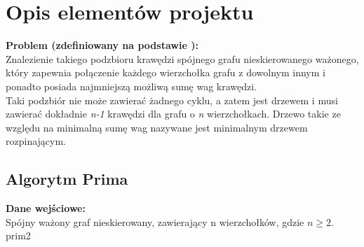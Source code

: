 \chapter [Sprawozdanie 2]{Opis elementów projektu} 
\fancyhead[L]{}
\fancyhead[R]{}
\textbf{Problem (zdefiniowany na podstawie \cite{prim2}):}\\
Znalezienie takiego podzbioru krawędzi spójnego grafu nieskierowanego ważonego, który zapewnia połączenie każdego wierzchołka grafu z dowolnym innym i ponadto posiada najmniejszą możliwą sumę wag krawędzi. \\Taki podzbiór nie może zawierać żadnego cyklu, a zatem jest drzewem i musi zawierać dokładnie \emph{n-1} krawędzi dla grafu o \emph{n} wierzchołkach. Drzewo takie ze względu na minimalną sumę wag nazywane jest minimalnym drzewem rozpinającym.

\section{Algorytm Prima}
\textbf{Dane wejściowe:} \\ 
Spójny ważony graf nieskierowany, zawierający n wierzchołków, gdzie $n \geqslant 2$.\\
prim2
